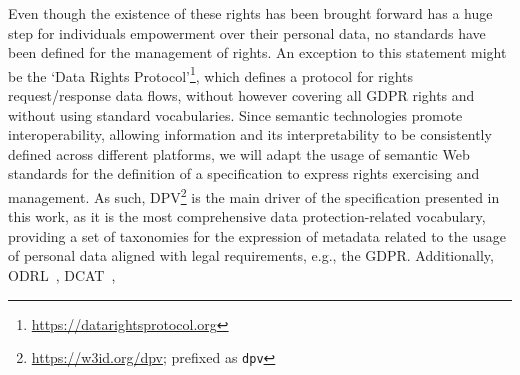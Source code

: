 \documentclass{IOS-Book-Article}     %
\begin{document}
Even though the existence of these rights has been brought forward has a huge step for individuals empowerment over their personal data, no standards have been defined for the management of rights.
An exception to this statement might be the `Data Rights Protocol'\footnote{\url{https://datarightsprotocol.org}}, which defines a protocol for rights request/response data flows, without however covering all GDPR rights and without using standard vocabularies.
Since semantic technologies promote interoperability, allowing information and its interpretability to be consistently defined across different platforms, 
we will adapt the usage of semantic Web standards for the definition of a specification to express rights exercising and management.
As such, DPV\footnote{\url{https://w3id.org/dpv}; prefixed as  \texttt{dpv}}\cite{panditCreatingVocabularyData2019,pandit2024dpv} is the main driver of the specification presented in this work, as it is the most comprehensive data protection-related vocabulary, providing a set of taxonomies for the expression of metadata related to the usage of personal data aligned with legal requirements, e.g., the GDPR.
Additionally,
ODRL~\cite{iannella_odrl_2018}, 
DCAT~\cite{albertoni_dcat_2024}, 
\end{document}
